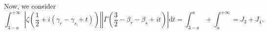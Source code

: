\documentclass[reqno]{amsart}
\numberwithin{equation}{section}
\theoremstyle{remark}
\begin{document}

Now, we consider
\[
\int_{3-a}^{+\infty}\left|\zeta\left(\frac{1}{2}+i(\gamma_r-\gamma_s+t)\right)\right|\left|\Gamma\left(\frac{3}{2}-\beta_r-\beta_s+it\right)\right|\text{d} t=\int_{3-a}^a+\int_a^{+\infty}=J_3+J_4.
\]
\end{document}
